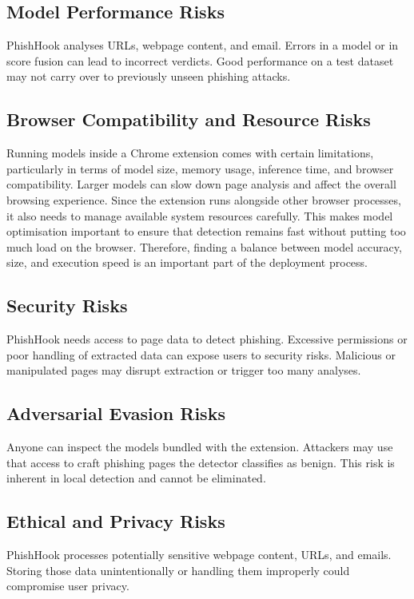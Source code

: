 \documentclass{FastFyp}
\begin{document}
\subsection{Model Performance Risks}
PhishHook analyses URLs, webpage content, and email. Errors in a model or in score fusion can lead to incorrect verdicts. Good performance on a test dataset may not carry over to previously unseen phishing attacks.

\subsection{Browser Compatibility and Resource Risks}
Running models inside a Chrome extension comes with certain limitations, particularly in terms of model size, memory usage, inference time, and browser compatibility. Larger models can slow down page analysis and affect the overall browsing experience. Since the extension runs alongside other browser processes, it also needs to manage available system resources carefully. This makes model optimisation important to ensure that detection remains fast without putting too much load on the browser. Therefore, finding a balance between model accuracy, size, and execution speed is an important part of the deployment process.

\subsection{Security Risks}
PhishHook needs access to page data to detect phishing. Excessive permissions or poor handling of extracted data can expose users to security risks. Malicious or manipulated pages may disrupt extraction or trigger too many analyses.

\subsection{Adversarial Evasion Risks}
Anyone can inspect the models bundled with the extension. Attackers may use that access to craft phishing pages the detector classifies as benign. This risk is inherent in local detection and cannot be eliminated.

\subsection{Ethical and Privacy Risks}
PhishHook processes potentially sensitive webpage content, URLs, and emails. Storing those data unintentionally or handling them improperly could compromise user privacy.
\end{document}
